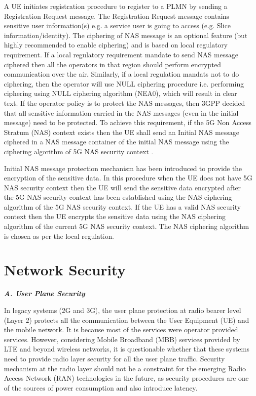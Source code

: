 \begin{multicols}{2}
A UE initiates registration procedure to register to a PLMN by sending a Registration Request message. The Registration Request message contains sensitive user information(s) e.g. a service user is going to access (e.g. Slice information/identity). The ciphering of NAS message is an optional feature (but highly recommended to enable ciphering) and is based on local regulatory requirement. If a local regulatory requirement mandate to send NAS message ciphered then all the operators in that region should perform encrypted communication over the air. Similarly, if a local regulation mandats not to do ciphering, then the operator will use NULL ciphering procedure i.e. performing ciphering using NULL ciphering algorithm (NEA0), which will result in clear text. If the operator policy is to protect the NAS messages, then 3GPP decided that all sensitive information carried in the NAS messages (even in the initial message) need to be protected. To achieve this requirement, if the 5G Non Access Stratum (NAS) context exists then the UE shall send an Initial NAS message ciphered in a NAS message container of the initial NAS message using the ciphering algorithm of 5G NAS security context \cite{art4-key03}.

Initial NAS message protection mechanism has been introduced to provide the encryption of the sensitive data. In this procedure when the UE does not have 5G NAS security context then the UE will send the sensitive data encrypted after the 5G NAS security context has been established using the NAS ciphering algorithm of the 5G NAS security context. If the UE has a valid NAS security context then the UE encrypts the sensitive data using the NAS ciphering algorithm of the current 5G NAS security context. The NAS ciphering algorithm is chosen as per the local regulation.

\section{Network Security}

\noindent
{\bf {\textit{A. User Plane Security}}}

In legacy systems (2G and 3G), the user plane protection at radio bearer level (Layer 2) protects all the communication between the User Equipment (UE) and the mobile network. It is because most of the services were operator provided services. However, considering Mobile Broadband (MBB) services provided by LTE and beyond wireless networks, it is questionable whether that these systems need to provide radio layer security for all the user plane traffic. Security mechanism at the radio layer should not be a constraint for the emerging Radio Access Network (RAN) technologies in the future, as security procedures are one of the sources of power consumption and also introduce latency.


\end{multicols}
